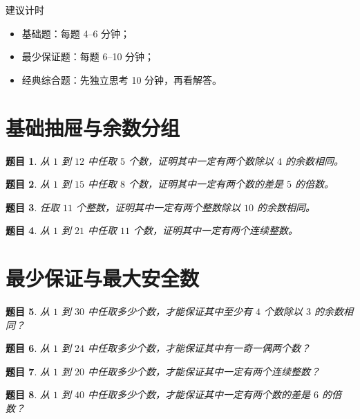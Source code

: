\documentclass[11pt,a4paper,fontset=fandol]{ctexart}
\theoremstyle{formalexample}
\newtheorem{exercise}{题目}[section]
\begin{document}
\begin{notebox}{建议计时}
\begin{itemize}
  \item 基础题：每题 4--6 分钟；
  \item 最少保证题：每题 6--10 分钟；
  \item 经典综合题：先独立思考 10 分钟，再看解答。
\end{itemize}
\end{notebox}

\section{基础抽屉与余数分组}

\begin{exercise}
从 $1$ 到 $12$ 中任取 $5$ 个数，证明其中一定有两个数除以 $4$ 的余数相同。
\end{exercise}

\begin{exercise}
从 $1$ 到 $15$ 中任取 $8$ 个数，证明其中一定有两个数的差是 $5$ 的倍数。
\end{exercise}

\begin{exercise}
任取 $11$ 个整数，证明其中一定有两个整数除以 $10$ 的余数相同。
\end{exercise}

\begin{exercise}
从 $1$ 到 $21$ 中任取 $11$ 个数，证明其中一定有两个连续整数。
\end{exercise}

\section{最少保证与最大安全数}

\begin{exercise}
从 $1$ 到 $30$ 中任取多少个数，才能保证其中至少有 $4$ 个数除以 $3$ 的余数相同？
\end{exercise}

\begin{exercise}
从 $1$ 到 $24$ 中任取多少个数，才能保证其中有一奇一偶两个数？
\end{exercise}

\begin{exercise}
从 $1$ 到 $20$ 中任取多少个数，才能保证其中一定有两个连续整数？
\end{exercise}

\begin{exercise}
从 $1$ 到 $40$ 中任取多少个数，才能保证其中一定有两个数的差是 $6$ 的倍数？
\end{exercise}
\end{document}

